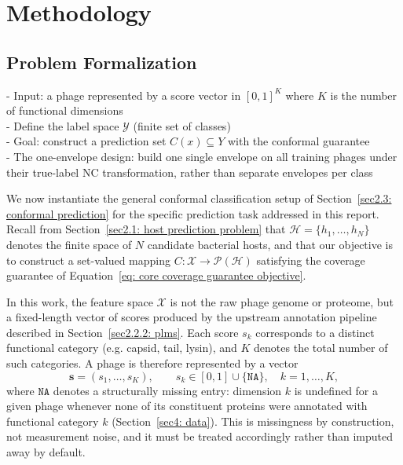 \section{Methodology}
\label{sec3: methodology}

\subsection{Problem Formalization}
\label{sec3.1: problem formalisation}


\noindent - Input: a phage represented by a score vector in $[0,1]^K$ where $K$ is the number of functional dimensions\\
- Define the label space $\mathcal{Y}$ (finite set of classes)\\
- Goal: construct a prediction set $C(x)\subseteq Y$ with the conformal guarantee\\
- The one-envelope design: build one single envelope on all training phages under their true-label NC transformation, 
rather than separate envelopes per class





\noindent We now instantiate the general conformal classification setup of Section~\ref{sec2.3: conformal prediction} 
for the specific prediction task addressed in this report. Recall from Section~\ref{sec2.1: host prediction problem} 
that $\mathcal{H} = \{h_1, \ldots, h_N\}$ denotes the finite space of $N$ candidate bacterial hosts, and that our 
objective is to construct a set-valued mapping $C: \mathcal{X} \to \mathcal{P}(\mathcal{H})$ satisfying the coverage 
guarantee of Equation~\eqref{eq: core coverage guarantee objective}.

\vspace{0.15cm}
\noindent In this work, the feature space $\mathcal{X}$ is not the raw phage genome or proteome, but a fixed-length 
vector of scores produced by the upstream annotation pipeline described in Section~\ref{sec2.2.2: plms}. Each score 
$s_k$ corresponds to a distinct functional category (e.g. capsid, tail, lysin), and $K$ denotes the total number of 
such categories. A phage is therefore represented by a vector
\begin{equation*}
\mathbf{s} = (s_1, \ldots, s_K), \qquad s_k \in [0,1] \cup \{\texttt{NA}\}, \quad k = 1, \ldots, K,
\end{equation*}
where $\texttt{NA}$ denotes a structurally missing entry: dimension $k$ is undefined for a given phage whenever none 
of its constituent proteins were annotated with functional category $k$ (Section~\ref{sec4: data}). This is missingness 
by construction, not measurement noise, and it must be treated accordingly rather than imputed away by default.

